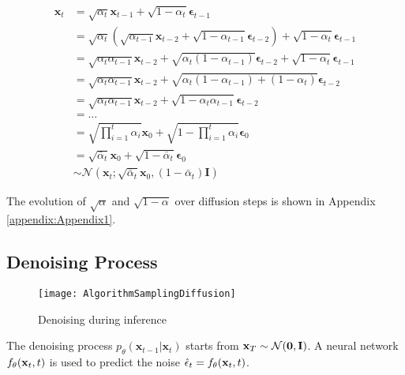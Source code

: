 \begin{equation}
	\begin{aligned}
		\boldsymbol{x}_t &= \sqrt{\alpha_t}\boldsymbol{x}_{t-1} + \sqrt{1 - \alpha_t}\boldsymbol{\epsilon}_{t-1} \\
		&= \sqrt{\alpha_t}\left(\sqrt{\alpha_{t-1}}\boldsymbol{x}_{t-2} + \sqrt{1 - \alpha_{t-1}}\boldsymbol{\epsilon}_{t-2}\right) + \sqrt{1 - \alpha_t}\boldsymbol{\epsilon}_{t-1} \\
		&= \sqrt{\alpha_t\alpha_{t-1}}\boldsymbol{x}_{t-2} + \sqrt{\alpha_t(1 - \alpha_{t-1})}\boldsymbol{\epsilon}_{t-2} + \sqrt{1 - \alpha_t}\boldsymbol{\epsilon}_{t-1} \\
		&= \sqrt{\alpha_t\alpha_{t-1}}\boldsymbol{x}_{t-2} + \sqrt{\alpha_t(1 - \alpha_{t-1}) + (1 - \alpha_t)}\boldsymbol{\epsilon}_{t-2} \\
		&= \sqrt{\alpha_t\alpha_{t-1}}\boldsymbol{x}_{t-2} + \sqrt{1 - \alpha_t\alpha_{t-1}}\boldsymbol{\epsilon}_{t-2} \\
		&= \ldots \\
		&= \sqrt{\prod_{i=1}^t \alpha_i} \boldsymbol{x}_0 + \sqrt{1 - \prod_{i=1}^t \alpha_i} \boldsymbol{\epsilon}_0 \\
		&= \sqrt{\bar{\alpha}_t} \boldsymbol{x}_0 + \sqrt{1 - \bar{\alpha}_t} \boldsymbol{\epsilon}_0 \\
		&\sim \mathcal{N}\left(\boldsymbol{x}_t; \sqrt{\bar{\alpha}_t} \boldsymbol{x}_0, \left(1 - \bar{\alpha}_t\right) \textbf{I}\right)
	\end{aligned}
	\label{eq:tracexzero}
\end{equation}

The evolution of $\sqrt{\alpha}$ and $\sqrt{1 - \alpha}$ over diffusion steps is shown in Appendix \autoref{appendix:Appendix1}.

\subsection{Denoising Process}
\label{subsection:denoising_process}

\begin{figure}[h]
	\centering
	\texttt{[image: AlgorithmSamplingDiffusion]}
	\caption{Denoising during inference}
	\label{fig:AlgorithmSamplingDiffusion}
	\vspace{-5pt}
\end{figure}

The denoising process $p_\theta(\mathbf{x}_{t-1} \vert \mathbf{x}_t)$ starts from $\mathbf{x}_T \sim \mathcal{N}(\mathbf{0}, \mathbf{I})$. A neural network $f_{\theta}(\mathbf{x}_t, t)$ is used to predict the noise $\hat{\epsilon}_t = f_{\theta}(\mathbf{x}_t, t)$.

